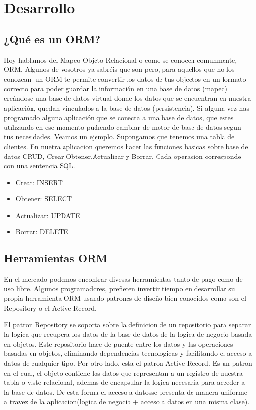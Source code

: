 \documentclass[twoside,twocolumn]{article}
\begin{document}
\section{Desarrollo}

\subsection{¿Qué es un ORM?}

Hoy hablamos del Mapeo Objeto Relacional o como se conocen comunmente, ORM, Algunos de vosotros ya 
sabréis que son pero, para aquellos que
no los conozcan, un ORM te permite
convertir los datos de tus objectos en un
formato correcto para poder guardar la
información en una base de datos (mapeo)
creándose una base de datos virtual
donde los datos que se encuentran en
nuestra aplicación, quedan vinculados a
la base de datos (persistencia). Si alguna vez has programado alguna aplicación que se conecta a una base de
datos, que estes utilizando en ese momento pudiendo cambiar de motor de base de datos segun tus necesidades.
Veamos un ejemplo. Supongamos que tenemos una tabla de clientes. En nuetra aplicacion queremos hacer las funciones basicas
sobre base de datos CRUD, Crear Obtener,Actualizar y Borrar, Cada operacion corresponde con una sentencia SQL. 
\begin{itemize}
	\item Crear: INSERT
	\item Obtener: SELECT
	\item Actualizar: UPDATE
	\item Borrar: DELETE
\end{itemize}



\subsection{Herramientas ORM}

En el mercado podemos encontrar divesas herramientas tanto de pago como de uso libre. Algunos programadores, 
prefieren invertir tiempo en desarrollar su propia herramienta ORM usando patrones de diseño bien conocidos como 
son el Repository o el Active Record.

El patron Repository se soporta sobre la definicion de un repositorio para separar la logica que recupera los datos de 
la base de datos de la logica de negocio basada en objetos. Este repositorio hace de puente entre los datos y las operaciones basadas
en objetos, eliminando dependencias tecnologicas y facilitando el acceso a datos de cualquier tipo.
Por otro lado, esta el patron Active Record. Es un patron en el cual, el objeto contiene los datos que representan a un registro de 
nuestra tabla o viste relacional, ademas de encapsular la logica necesaria para acceder a la base de datos. De esta forma el acceso a datosse presenta de manera uniforme a travez
de la aplicacion(logica de negocio + acceso a datos en una misma clase).
\end{document}
